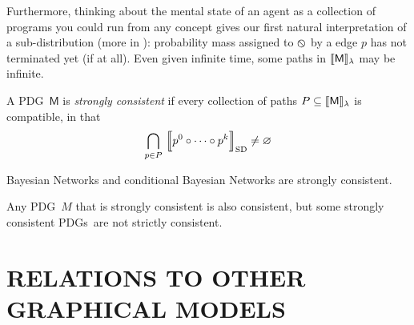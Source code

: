 \documentclass{article}
\newcommand\SD{_{\text{SD}}}
\newcommand{\none}{\varobslash}
\newcommand{\sfM}{\mathsf M}
\newcommand{\MN}{PDG}
\newcommand{\MNs}{\MN s}
\numberwithin{equation}{section}
\begin{document}
\begin{notfocus}
\begin{vfull}
	
	Furthermore, thinking about the mental state of an agent as a collection of programs you could run from any concept gives our first natural interpretation of a sub-distribution (more in ): probability mass assigned to $\none$ by a edge $p$ has not terminated yet (if at all). 
	Even given infinite time, some paths in $\bbr{\sfM}_\lambda$ may be infinite.
	
	\begin{defn}
		A \MN\ $\sfM$ is \emph{strongly consistent} if every collection of paths $P \subseteq \bbr{\sfM}_\lambda$ is compatible, in that 
		$$\bigcap_{p \in P}\ \bbr*{\vphantom{\Big|}p^0\circ \cdots\circ p^k}\SD \neq \varnothing$$
	\end{defn}

	\begin{example}
		Bayesian Networks and conditional Bayesian Networks are strongly consistent.
	\end{example}

	\begin{prop}
		Any \MN\ $M$ that is strongly consistent is also consistent, but some strongly consistent \MNs\ are not strictly consistent.
	\end{prop}




	\end{vfull}



	\section{RELATIONS TO OTHER GRAPHICAL MODELS}\label{sec:other-graphical-models}
	

\end{notfocus}
\end{document}
